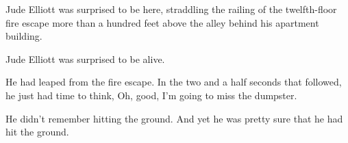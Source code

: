 \line{}\vfil

\noindent
Jude Elliott was surprised to be here,
straddling the railing of the twelfth-floor fire escape
more than a hundred feet above the alley behind his apartment building.

Jude Elliott was surprised to be alive.

He had leaped from the fire escape.
In the two and a half seconds that followed,
he just had time to think,
Oh, good, I’m going to miss the dumpster.

He didn’t remember hitting the ground.
And yet he was pretty sure that he had hit the ground.
